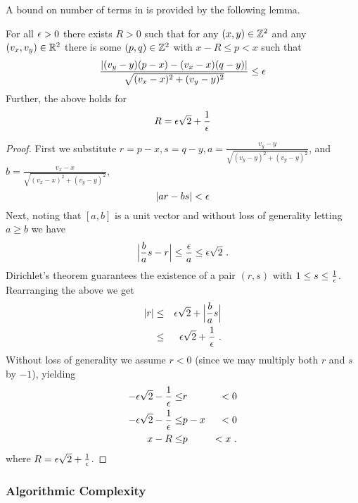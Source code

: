 A bound on number of terms in  is
provided by the following lemma.
\newcommand\xa{p}
\newcommand\ya{q}
\begin{lemma}
  For all $\RoundoffEps>0$ there exists $R>0$ such that for any
  $(x,y)\in\Ints^2$ and any $(v_x,v_y)\in\Reals^2$ there is some
  $(\xa,\ya)\in\Ints^2$ with $x-R\leq\xa<x$ such that
  \begin{equation}
    \frac{|(v_y-y)(\xa-x) - (v_x-x)(\ya-y)|}
         {\sqrt{(v_x-x)^2+(v_y-y)^2}}
    \leq \RoundoffEps
  \end{equation}
  Further, the above holds for
  \begin{equation}
    R = \RoundoffEps\sqrt{2} + \frac{1}{\RoundoffEps}
  \end{equation}
\end{lemma}
\begin{proof}
  First we substitute $r=\xa-x, s=\ya-y, a =
  \frac{v_y-y}{\sqrt{(v_y-y)^2+(v_y-y)^2}}$, and $b =
  \frac{v_x-x}{\sqrt{(v_x-x)^2+(v_y-y)^2}}$,
  \begin{equation}
    |ar - bs| < \RoundoffEps
  \end{equation}
  Next, noting that $[a,b]$ is a unit vector and without loss of
  generality letting $a \geq b$ we have
  \begin{equation}
    \Bigl|\frac{b}{a}s - r\Bigr| \leq \frac{\RoundoffEps}{a} 
      \leq \RoundoffEps \sqrt{2} ~.
  \end{equation}
  Dirichlet's theorem \cite{Dirichlet1863} guarantees the existence of a pair $(r,s)$
  with $1 \leq s\leq\frac{1}{\RoundoffEps}$. Rearranging the above we get
  \begin{eqnarray}
    |r| &\leq& \RoundoffEps\sqrt{2} + \Bigl|\frac{b}{a}s\Bigr|\\
    &\leq& \RoundoffEps\sqrt{2} + \frac{1}{\RoundoffEps}~.
  \end{eqnarray}
  Without loss of generality we assume $r<0$ (since we may multiply
  both $r$ and $s$ by $-1$), yielding
  \begin{eqnarray}
    -\RoundoffEps\sqrt{2} - \frac{1}{\RoundoffEps} \leq &r& < 0\\
    -\RoundoffEps\sqrt{2} - \frac{1}{\RoundoffEps} \leq &p-x& < 0\\
    x-R \leq &p& < x ~.
  \end{eqnarray}
  where $R = \RoundoffEps\sqrt{2}+\frac{1}{\RoundoffEps}$.
\end{proof}

\subsubsection{Algorithmic Complexity}

